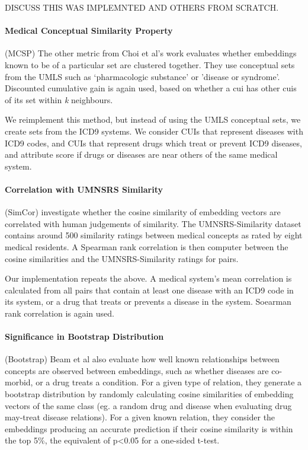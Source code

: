 \documentclass[10pt]{article}
\begin{document}
DISCUSS THIS WAS IMPLEMNTED AND OTHERS FROM SCRATCH.

\paragraph{Medical Conceptual Similarity Property}(MCSP) The other metric from Choi et al's work evaluates whether embeddings known to be of a particular set are clustered together. They use conceptual sets from the UMLS such as `pharmacologic substance' or 'disease or syndrome'.  Discounted cumulative gain is again used, based on whether a cui has other cuis of its set within \emph{k} neighbours. 

We reimplement this method, but instead of using the UMLS conceptual sets, we create sets from the ICD9 systems. We consider CUIs that represent diseases with ICD9 codes, and CUIs that represent drugs which treat or prevent ICD9 diseases, and attribute score if drugs or diseases are near others of the same medical system. 

\paragraph{Correlation with UMNSRS Similarity}(SimCor)
\cite{yuRetrofittingConceptVector2017} investigate whether the cosine similarity of embedding vectors are correlated with human judgements of similarity. The UMNSRS-Similarity dataset \cite{pakhomovSemanticRelatednessSimilarity2018} contains around 500 similarity ratings between medical concepts as rated by eight medical residents. A Spearman rank correlation is then computer between the cosine similarities and the UMNSRS-Similarity ratings for pairs. 

Our implementation repeats the above. A medical system's mean correlation is calculated from all pairs that contain at least one disease with an ICD9 code in its system, or a drug that treats or prevents a disease in the system.  Soearman rank correlation is again used. 

\paragraph{Significance in Bootstrap Distribution}(Bootstrap)
Beam et al  also evaluate how well known relationships between concepts are observed between embeddings, such as whether diseases are co-morbid, or a drug treats a condition. For a given type of relation, they generate a bootstrap distribution by randomly calculating cosine similarities of embedding vectors of the same class (eg. a random drug and disease when evaluating drug may-treat disease relations). For a given known relation, they consider the embeddings producing an accurate prediction if their cosine similarity is within the top 5\%, the equivalent of p<0.05 for a one-sided t-test. 
\end{document}

